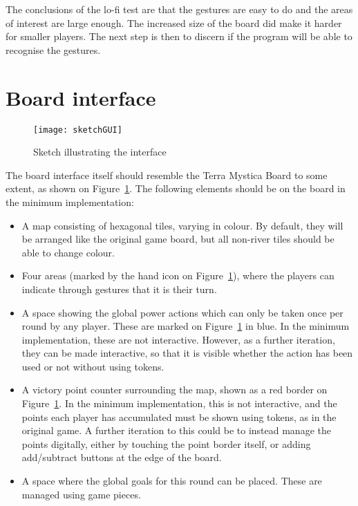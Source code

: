 The conclusions of the lo-fi test are that the gestures are easy to do and the areas of interest are large enough. The increased size of the board did make it harder for smaller players. The next step is then to discern if the program will be able to recognise the gestures. 

\section{Board interface}\label{sec:BoardInterface}
\begin{figure}
\centering
\texttt{[image: sketchGUI]}
\caption{Sketch illustrating the interface}
\label{fig:sketchGUI}
\end{figure}

The board interface itself should resemble the Terra Mystica Board to some extent, as shown on Figure~\ref{fig:sketchGUI}. The following elements should be on the board in the minimum implementation:
\begin{itemize}
\item A map consisting of hexagonal tiles, varying in colour. By default, they will be arranged like the original game board, but all non-river tiles should be able to change colour.
\item Four areas (marked by the hand icon on Figure~\ref{fig:sketchGUI}), where the players can indicate through gestures that it is their turn.
\item A space showing the global power actions which can only be taken once per round by any player. These are marked on Figure~\ref{fig:sketchGUI} in blue. In the minimum implementation, these are not interactive. However, as a further iteration, they can be made interactive, so that it is visible whether the action has been used or not without using tokens.
\item A victory point counter surrounding the map, shown as a red border on Figure~\ref{fig:sketchGUI}. In the minimum implementation, this is not interactive, and the points each player has accumulated must be shown using tokens, as in the original game. A further iteration to this could be to instead manage the points digitally, either by touching the point border itself, or adding add/subtract buttons at the edge of the board.
\item A space where the global goals for this round can be placed. These are managed using game pieces.
\end{itemize}

